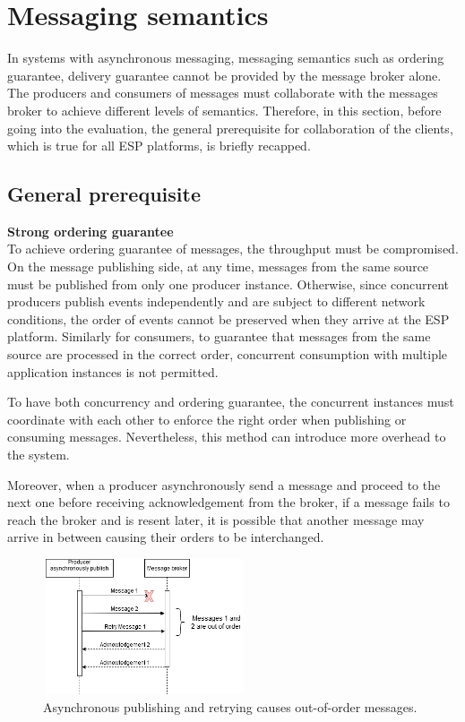 \section{Messaging semantics}
In systems with asynchronous messaging, messaging semantics such as ordering guarantee, delivery guarantee cannot be provided by the message broker alone. The producers and consumers of messages must collaborate with the messages broker to achieve different levels of semantics. Therefore, in this section, before going into the evaluation, the general prerequisite for collaboration of the clients, which is true for all ESP platforms, is briefly recapped.
\subsection{General prerequisite}
\textbf{Strong ordering guarantee}\\
To achieve ordering guarantee of messages, the throughput must be compromised. On the message publishing side, at any time, messages from the same source must be published from only one producer instance. Otherwise, since concurrent producers publish events independently and are subject to different network conditions, the order of events cannot be preserved when they arrive at the ESP platform. Similarly for consumers, to guarantee that messages from the same source are processed in the correct order, concurrent consumption with multiple application instances is not permitted.

To have both concurrency and ordering guarantee, the concurrent instances must coordinate with each other to enforce the right order when publishing or consuming messages. Nevertheless, this method can introduce more overhead to the system.

Moreover, when a producer asynchronously send a message and proceed to the next one before receiving acknowledgement from the broker, if a message fails to reach the broker and is resent later, it is possible that another message may arrive in between causing their orders to be interchanged.
\begin{figure}[h]
	\centering
	\includegraphics[width=6cm,height=4cm]{images/order.png}
	\caption{Asynchronous publishing and retrying causes out-of-order messages.}
	\label{fig:outorderretry}
\end{figure}

